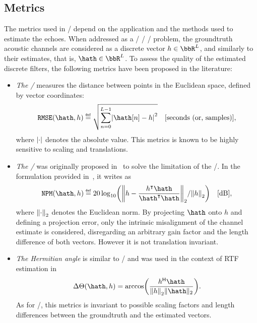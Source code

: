 \subsection{Metrics}\label{subsec:estimation:metrics}
The metrics used in \AER/ depend on the application and the methods used to estimate the echoes.
When addressed as a \FIR/ \SIMO/ \BCE/ problem, the groundtruth acoustic channels are considered as a discrete vector $h \in \bbR^L$, and similarly to their estimates, that is, $\hath \in \bbR^L$.
To assess the quality of the estimated discrete filters, the following metrics have been proposed in the literature:
\begin{itemize}
    \item \textit{The \RMSEtxt/}  measures the distance between points in the Euclidean space, defined by vector coordinates:
    \begin{equation}
        \RMSE(\hath, h) \eqdef \sqrt{\sum_{n=0}^{L-1} \abs{\hath[n] - h}^2} \quad \text{[seconds (or, samples)]}
        ,
    \end{equation}
    where $\abs{\cdot}$ denotes the absolute value.
    This metrics is known to be highly sensitive to scaling and translations.

    \item \textit{The \NPMtxt/}  was originally proposed in~ to solve the limitation of the \RMSEtxt/.
    In the formulation provided in~, it writes as
    \begin{equation}
        \NPM(\hath,h) \eqdef 20 \log_{10} \kparen{ \norm{h - \frac{\ktranspose{h}\hath}{\ktranspose{\hath} \hath}}_2 / \norm{h}_2} \quad \text{[dB]}
        ,
    \end{equation}
    where $\norm{\cdot}_2$ denotes the Euclidean norm.
    By projecting $\hath$ onto $h$ and defining a projection error, only the intrinsic misalignment of the channel estimate is considered, disregarding an arbitrary gain factor and the length difference of both vectors.
    However it is not translation invariant.

    \item \textit{The Hermitian angle} is similar to \NPMtxt/ and was used in the context of RTF estimation in~
    \begin{equation}
        \Delta\Theta(\hath,h) = \arccos\kparen{\frac{\khermitian{h}\hath}{\norm{h}_2\|\hath\|_2}}
        .
    \end{equation}
    As for \NPMtxt/, this metrics is invariant to possible scaling factors and length differences between the groundtruth and the estimated vectors.
\end{itemize}

